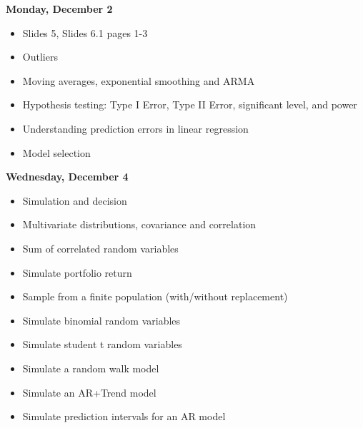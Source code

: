 \documentclass[11pt]{article}
\begin{document}
\noindent\textbf{\large Monday, December 2}
\begin{itemize}
\item %
Slides 5, Slides 6.1 pages 1-3
\item Outliers
\item Moving averages, exponential smoothing and ARMA
\item Hypothesis testing: Type I Error, Type II Error, significant level, and power
\item Understanding prediction errors in linear regression
\item Model selection


\end{itemize}






\vspace{5mm}


\noindent\textbf{\large Wednesday, December 4} 
\begin{itemize}
\item Simulation and decision
\item Multivariate distributions, covariance and correlation
\item Sum of correlated random variables 
\item Simulate portfolio return
\item Sample from a finite population (with/without replacement)
\item Simulate binomial random variables
\item Simulate student t random variables
\item Simulate a random walk model
\item Simulate an AR+Trend model
\item Simulate prediction intervals for an AR model
\end{itemize}




\end{document}
